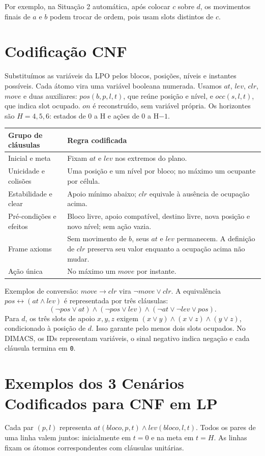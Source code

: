 \documentclass[11pt,a4paper]{article}
\newcommand{\code}[1]{\texttt{#1}}
\begin{document}
Por exemplo, na Situação 2 automática, após colocar $c$ sobre $d$, os movimentos finais de $a$ e $b$ podem trocar de ordem, pois usam slots distintos de $c$.

\section{Codificação CNF}
Substituímos as variáveis da LPO pelos blocos, posições, níveis e instantes possíveis. Cada átomo vira uma variável booleana numerada. Usamos $at$, $lev$, $clr$, $move$ e duas auxiliares: $pos(b,p,l,t)$, que reúne posição e nível, e $occ(s,l,t)$, que indica slot ocupado. $on$ é reconstruído, sem variável própria. Os horizontes são $H=4,5,6$: estados de 0 a H e ações de 0 a H$-1$.

\begin{tabularx}{\linewidth}{L{3.5cm}Y}
\toprule Grupo de cláusulas & Regra codificada \\ \midrule
Inicial e meta & Fixam $at$ e $lev$ nos extremos do plano.\\
Unicidade e colisões & Uma posição e um nível por bloco; no máximo um ocupante por célula.\\
Estabilidade e clear & Apoio mínimo abaixo; $clr$ equivale à ausência de ocupação acima.\\
Pré-condições e efeitos & Bloco livre, apoio compatível, destino livre, nova posição e novo nível; sem ação vazia.\\
Frame axioms & Sem movimento de $b$, seus $at$ e $lev$ permanecem. A definição de $clr$ preserva seu valor enquanto a ocupação acima não mudar.\\
Ação única & No máximo um $move$ por instante.\\ \bottomrule
\end{tabularx}

Exemplos de conversão: $move\rightarrow clr$ vira $\neg move\lor clr$. A equivalência $pos\leftrightarrow(at\land lev)$ é representada por três cláusulas:
\[(\neg pos\lor at)\land(\neg pos\lor lev)\land(\neg at\lor\neg lev\lor pos).\]
Para $d$, os três slots de apoio $x,y,z$ exigem $(x\lor y)\land(x\lor z)\land(y\lor z)$, condicionado à posição de $d$. Isso garante pelo menos dois slots ocupados. No DIMACS, os IDs representam variáveis, o sinal negativo indica negação e cada cláusula termina em \code{0}.

\newpage
\section{Exemplos dos 3 Cenários Codificados para CNF em LP}
Cada par $(p,l)$ representa $at(bloco,p,t)\land lev(bloco,l,t)$. Todos os pares de uma linha valem juntos: inicialmente em $t=0$ e na meta em $t=H$. As linhas fixam os átomos correspondentes com cláusulas unitárias.
\end{document}
